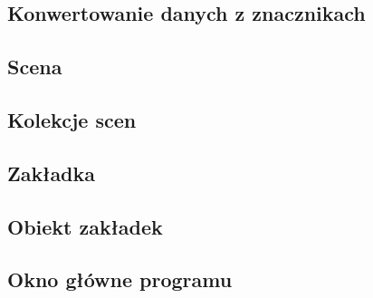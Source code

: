 
\subsection{Konwertowanie danych z znacznikach}


\subsection{Scena}


\subsection{Kolekcje scen}


\subsection{Zakładka}


\subsection{Obiekt zakładek}


\subsection{Okno główne programu}

